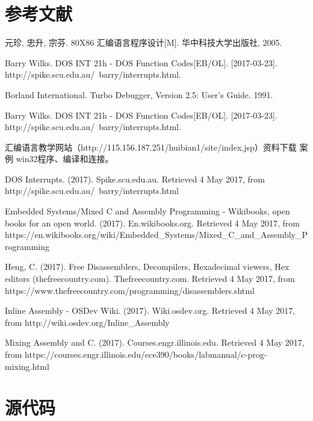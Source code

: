 \documentclass{article}
\begin{document}
\newpage
\appendix
\section{参考文献}
\begin{minipage}{1.0\textwidth}
	\begin{enumerate}[{[}1{]}]
		\item 元珍, 忠升, 宗芬. 80X86 汇编语言程序设计[M]. 华中科技大学出版社, 2005.
		\item Barry Wilks. DOS INT 21h - DOS Function Codes[EB/OL]. [2017-03-23]. http://spike.scu.edu.au/~barry/interrupts.html.
		\item Borland International. Turbo Debugger, Version 2.5: User's Guide. 1991.
		\item Barry Wilks. DOS INT 21h - DOS Function Codes[EB/OL]. [2017-03-23]. http://spike.scu.edu.au/~barry/interrupts.html.
		\item 汇编语言教学网站（http://115.156.187.251/huibian1/site/index.jsp）\textrightarrow 资料下载 \textrightarrow 案例 \textrightarrow win32程序、编译和连接。
		\item DOS Interrupts. (2017). Spike.scu.edu.au. Retrieved 4 May 2017, from http://spike.scu.edu.au/~barry/interrupts.html
		\item Embedded Systems/Mixed C and Assembly Programming - Wikibooks, open books for an open world. (2017). En.wikibooks.org. Retrieved 4 May 2017, from https://en.wikibooks.org/wiki/Embedded\_Systems/Mixed\_C\_and\_Assembly\_Programming
		\item Heng, C. (2017). Free Disassemblers, Decompilers, Hexadecimal viewers, Hex editors (thefreecountry.com). Thefreecountry.com. Retrieved 4 May 2017, from https://www.thefreecountry.com/programming/disassemblers.shtml
		\item Inline Assembly - OSDev Wiki. (2017). Wiki.osdev.org. Retrieved 4 May 2017, from http://wiki.osdev.org/Inline\_Assembly
		\item Mixing Assembly and C. (2017). Courses.engr.illinois.edu. Retrieved 4 May 2017, from https://courses.engr.illinois.edu/ece390/books/labmanual/c-prog-mixing.html
	\end{enumerate}
\end{minipage}

\flushleft
\newpage
\section{源代码}
\end{document}
